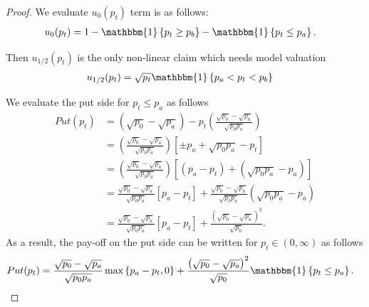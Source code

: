 \documentclass[pdftex,11pt,a4paper] {article}
\begin{document}
\begin{proof}
We evaluate $u_{0}(p_{t})$ term is as follows:
\begin{equation} \label{eq:rp2}
\begin{split}
u_{0}(p_{t}) & =  1 - \mathbbm{1}\left\{p_{t} \geq p_{b}\right\} - \mathbbm{1}\left\{p_{t}\leq p_{a}\right\}.
\end{split}
\end{equation}

Then $u_{1/2}(p_{t})$ is the only non-linear claim which needs model valuation
\begin{equation} \label{eq:rp3}
\begin{split}
u_{1/2}(p_{t}) & =  \sqrt{p_{t}} \mathbbm{1}\left\{ p_{a} < p_{t} < p_{b}\right\}
\end{split}
\end{equation}



We evaluate the put side for $p_{t} \leq p_{a}$ as follows
\begin{equation} \label{eq:mdp2}
\begin{split}
Put(p_{t}) & =  \left(\sqrt{p_{0}} - \sqrt{p_{a}}\right) -  p_{t} \left(\frac{\sqrt{p_{0}}-\sqrt{p_{a}}}{\sqrt{p_{0}p_{a}}} \right)\\
& = \left(\frac{\sqrt{p_{0}}-\sqrt{p_{a}}}{\sqrt{p_{0}p_{a}}} \right)  \left[\pm p_{a} + \sqrt{p_{0}p_{a}} -  p_{t} \right]\\
& = \left(\frac{\sqrt{p_{0}}-\sqrt{p_{a}}}{\sqrt{p_{0}p_{a}}} \right)  \left[ \left(p_{a}-p_{t} \right)  + \left(\sqrt{p_{0}p_{a}} -  p_{a}\right) \right]\\
& = \frac{\sqrt{p_{0}}-\sqrt{p_{a}}}{\sqrt{p_{0}p_{a}}} \left[ p_{a}-p_{t} \right]  + \frac{\sqrt{p_{0}}-\sqrt{p_{a}}}{\sqrt{p_{0}p_{a}}}\left(\sqrt{p_{0}p_{a}} -  p_{a}\right)\\
& = \frac{\sqrt{p_{0}}-\sqrt{p_{a}}}{\sqrt{p_{0}p_{a}}} \left[ p_{a}-p_{t} \right]  + \frac{\left(\sqrt{p_{0}}-\sqrt{p_{a}}\right)^{2}}{\sqrt{p_{0}}}.
\end{split}
\end{equation}
As a result, the pay-off on the put side can be written for $p_{t}\in(0, \infty)$ as follows
\begin{equation} \label{eq:mdp3}
\begin{split}
Put(p_{t}) & = \frac{\sqrt{p_{0}}-\sqrt{p_{a}}}{\sqrt{p_{0}p_{a}}} \max\left\{ p_{a}-p_{t}, 0\right\}  + \frac{\left(\sqrt{p_{0}}-\sqrt{p_{a}}\right)^{2}}{\sqrt{p_{0}}} \mathbbm{1}\left\{p_{t}\leq p_{a}\right\}.
\end{split}
\end{equation}




\end{proof}
\end{document}
